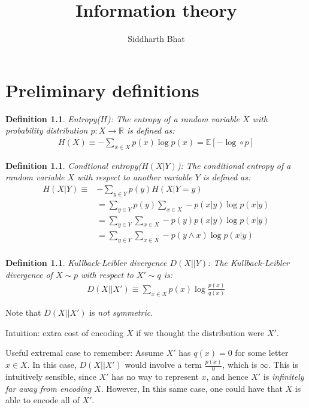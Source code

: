 \documentclass[11pt]{book}
\title{Information theory}
\author{Siddharth Bhat}
\date{}
\newtheorem{definition}[theorem]{Definition}
\renewcommand{\H}{\ensuremath{H}}
\newcommand{\E}{\ensuremath{\mathbb{E}}}
\newcommand{\R}{\ensuremath{\mathbb{R}}}
\newcommand{\KL}[2]{\ensuremath{D(#1 || #2)}}
\begin{document}
\maketitle
\tableofcontents

\chapter{Preliminary definitions}

\begin{definition}
    Entropy(\H): The entropy of a random variable $X$ with probability
    distribution $p: X \rightarrow \R $ is defined as:
    \begin{align*}
        \H(X) \equiv - \sum_{x \in X} p(x) \log p(x) = \E[- \log \circ p]
    \end{align*}
\end{definition}

\begin{definition}
    Condtional entropy($\H(X|Y)$): The conditional entropy of a random 
    variable $X$ with respect to another variable $Y$ is defined as:
    \begin{align*}
        \H(X|Y) \equiv &- \sum_{y \in Y} p(y) \H(X|Y=y) \\
                       &= \sum_{y \in Y} p(y) \sum_{x \in X} - p(x|y) \log p(x | y)\\
                       &= \sum_{y \in Y} \sum_{x \in X} - p(y) p(x|y) \log p(x | y)\\
                       &= \sum_{y \in Y} \sum_{x \in X} - p(y \land x) \log p(x | y)\\
    \end{align*}
\end{definition}

\begin{definition}
    Kullback-Leibler divergence \KL{X}{Y}: The Kullback-Leibler divergence
    of $X \sim p $ with respect to $X' \sim q$ is:
    \begin{align*}
        \KL{X}{X'} \equiv \sum_{x \in X} p(x) \log \frac{p(x)}{q(x)}
    \end{align*}
\end{definition}

Note that \KL{X}{X'} is \emph{not symmetric}.

Intuition: extra cost of encoding $X$ if we thought the distribution were $X'$.

Useful extremal case to remember: Assume $X'$ has $q(x) = 0$ for some
letter $x \in X$. In this case, $\KL{X}{X'}$ would involve a term $\frac{p(x)}{0}$,
which is $\infty$. This is intuitively sensible, since $X'$ has no way to represent
$x$, and hence $X'$ is \textit{infinitely far away from encoding $X$}. However,
In this same case, one could have that $X$ is able to encode all of $X'$.
\end{document}
